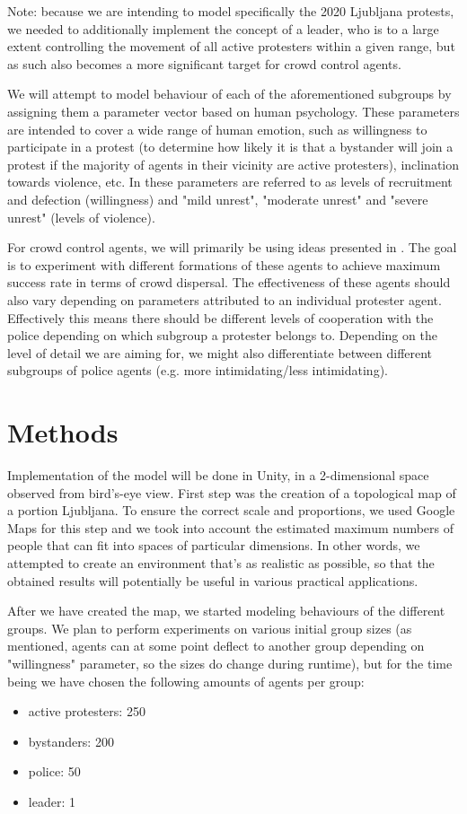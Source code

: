 \documentclass[9pt]{pnas-new}
\begin{document}
\bigskip
Note: because we are intending to model specifically the 2020 Ljubljana protests, we needed to additionally implement the concept of a leader, who is to a large extent controlling the movement of all active protesters within a given range, but as such also becomes a more significant target for crowd control agents. 

\bigskip
We will attempt to model behaviour of each of the aforementioned subgroups by assigning them a parameter vector based on human psychology. These parameters are intended to cover a wide range of human emotion, such as willingness to participate in a protest (to determine how likely it is that a bystander will join a protest if the majority of agents in their vicinity are active protesters), inclination towards violence, etc. In \cite{sportsriots} these parameters are referred to as levels of recruitment and defection (willingness) and "mild unrest", "moderate unrest" and "severe unrest" (levels of violence). 


\bigskip
For crowd control agents, we will primarily be using ideas presented in \cite{crowdcontrol2}. The goal is to experiment with different formations of these agents to achieve maximum success rate in terms of crowd dispersal. The effectiveness of these agents should also vary depending on parameters attributed to an individual protester agent. Effectively this means there should be different levels of cooperation with the police depending on which subgroup a protester belongs to. Depending on the level of detail we are aiming for, we might also differentiate between different subgroups of police agents (e.g. more intimidating/less intimidating). 

\section*{Methods}

Implementation of the model will be done in Unity, in a 2-dimensional space observed from bird's-eye view. First step was the creation of a topological map of a portion Ljubljana. To ensure the correct scale and proportions, we used Google Maps for this step and we took into account the estimated maximum numbers of people that can fit into spaces of particular dimensions. In other words, we attempted to create an environment that's as realistic as possible, so that the obtained results will potentially be useful in various practical applications. 

\bigskip
After we have created the map, we started modeling behaviours of the different groups. We plan to perform experiments on various initial group sizes (as mentioned, agents can at some point deflect to another group depending on "willingness" parameter, so the sizes do change during runtime), but for the time being we have chosen the following amounts of agents per group:
\begin{itemize}
    \item active protesters: 250
    \item bystanders: 200
    \item police: 50
    \item leader: 1
\end{itemize}
\end{document}

